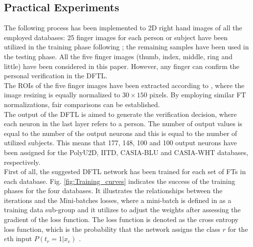 \documentclass[conference]{IEEEtran}
\begin{document}
\subsection{Practical Experiments}
The following process has been implemented to 2D right hand images of all the employed databases: 25 finger images for each person or subject have been utilized in the training phase following \cite{Al-Nima2017Robust} \cite{Al-Nima2017efficient} \cite{Al-Nima2017finger}; the remaining samples have been used in the testing phase. All the five finger images (thumb, index, middle, ring and little) have been considered in this paper. However, any finger can confirm the personal verification in the DFTL.\\
The ROIs of the five finger images have been extracted according to \cite{Al-Nima2017Robust} \cite{Al-Nima2017finger}, where the image resizing is equally normalized to $30\times 150$ pixels. By employing similar FT normalizations, fair comparisons can be established. \\
The output of the DFTL is aimed to generate the verification decision, where each neuron in the last layer refers to a person. The number of output values is equal to the number of the output neurons and this is equal to the number of utilized subjects. This means that 177, 148, 100 and 100 output neurons have been assigned for the PolyU2D, IITD, CASIA-BLU and CASIA-WHT databases, respectively. \\
First of all, the suggested DFTL network has been trained for each set of FTs in each database. Fig. \ref{fig:Training_curves} indicates the success of the training phases for the four databases. It illustrates the relationships between the iterations and the Mini-batches losses, where a mini-batch is defined in \cite{beale1992neural} as a training data sub-group and it utilizes to adjust the weights after assessing the gradient of the loss function. The loss function is denoted as the cross entropy loss function, which is the probability that the network assigns the class $r$ for the $e$th input $P(t_r=1|x_e)$ \cite{beale1992neural}.
\end{document}
